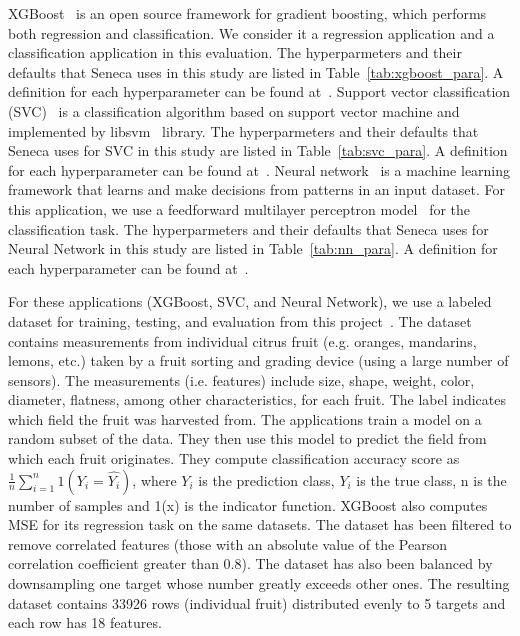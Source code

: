 XGBoost~\cite{ref:xgboost-web} is an open source framework for gradient boosting, which 
performs both regression and classification. We consider it a regression application and
a classification application in this evaluation.  
The hyperparmeters and their defaults that Seneca uses in this study are listed in Table~\ref{tab:xgboost_para}. A definition for each hyperparameter can be found at~\cite{xgboostparams}.
Support vector classification (SVC)~\cite{ref:svc} is a classification algorithm 
based on support vector machine and implemented by libsvm~\cite{ref:libsvm} library.
The hyperparmeters and their defaults that Seneca uses for SVC in this study are listed in Table~\ref{tab:svc_para}. A definition for each hyperparameter can be found at~\cite{xvcparams}.
Neural network~\cite{ref:neural_network} is a machine learning framework that learns 
and make decisions from patterns in an input dataset. For this application, 
we use a feedforward multilayer perceptron model~\cite{ref:feedforward_nn} 
for the classification task.
The hyperparmeters and their defaults that Seneca uses for Neural Network in this study are listed in Table~\ref{tab:nn_para}. A definition for each hyperparameter can be found at~\cite{nnparams}.

For these applications (XGBoost, SVC, and Neural Network), we use a labeled
dataset for training, testing, and evaluation from this
project~\cite{iot-cpu}. The dataset contains measurements from individual
citrus fruit (e.g. oranges, mandarins, lemons, etc.) taken by a fruit sorting
and grading device (using a large number of sensors).  The measurements (i.e.
features) include size, shape, weight, color, diameter, flatness, among other
characteristics, for each fruit.  The label indicates which field the fruit
was harvested from.  The applications train a model on a random subset of the
data.  They then use this model to predict the field
from which each fruit originates. They compute classification accuracy score
as $\frac{1}{n}\sum_{i=1}^{n}1(Y_i = \hat{Y_i})$, where $Y_i$ is the
prediction class, $Y_i$ is the true class, n is the number of samples and 1(x)
is the indicator function. XGBoost also computes MSE for its regression task
on the same datasets. The dataset has been filtered to remove correlated
features (those with an absolute value of the Pearson correlation coefficient
greater than 0.8). The dataset has also been balanced by downsampling one
target whose number greatly exceeds other ones. The resulting dataset contains
33926 rows (individual fruit) distributed evenly to 5 targets and each row has
18 features.

